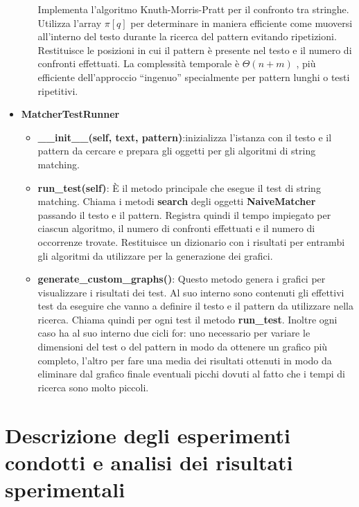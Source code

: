 \documentclass{article}
\begin{document}
\begin{itemize}
\begin{itemize}
        Implementa l'algoritmo Knuth-Morris-Pratt per il confronto tra stringhe. Utilizza l'array $\pi[q]$ per determinare in maniera efficiente come muoversi all'interno del testo durante la ricerca del pattern evitando ripetizioni.
        Restituisce le posizioni in cui il pattern è presente nel testo e il numero di confronti effettuati.
        La complessità temporale è $\Theta(n + m)$ , più efficiente dell'approccio ``ingenuo'' specialmente per pattern lunghi o testi ripetitivi.
    \end{itemize}
    \item \textbf{MatcherTestRunner}
    \begin{itemize}
        \item \textbf{\_\_init\_\_(self, text, pattern)}:inizializza l'istanza con il testo e il pattern da cercare e prepara gli oggetti per gli algoritmi di string matching.
        \item \textbf{run\_test(self)}: È il metodo principale che esegue il test di string matching. Chiama i metodi \textbf{search} degli oggetti \textbf{NaiveMatcher} passando il testo e il pattern. Registra quindi il tempo impiegato per ciascun algoritmo, il numero di confronti effettuati e il numero di occorrenze trovate. Restituisce un dizionario con i risultati per entrambi gli algoritmi da utilizzare per la generazione dei grafici.
        \item \textbf{generate\_custom\_graphs()}: Questo metodo genera i grafici per visualizzare i risultati dei test. Al suo interno sono contenuti gli effettivi test da eseguire che vanno a definire il testo e il pattern da utilizzare nella ricerca. Chiama quindi per ogni test il metodo \textbf{run\_test}. Inoltre ogni caso ha al suo interno due cicli for: uno necessario per variare le dimensioni del test o del pattern in modo da ottenere un grafico più completo, l'altro per fare una media dei risultati ottenuti in modo da eliminare dal grafico finale eventuali picchi dovuti al fatto che i tempi di ricerca sono molto piccoli.
    \end{itemize}
\end{itemize}

\newpage

\section{Descrizione degli esperimenti condotti e analisi dei risultati sperimentali}
\end{document}
